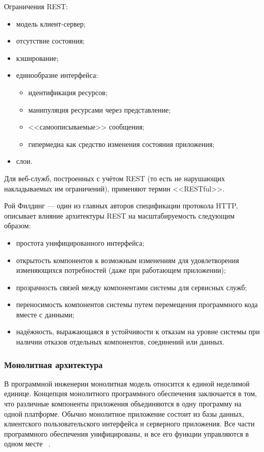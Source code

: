\documentclass[a4paper,14pt]{extarticle}
\begin{document}
 	Ограничения REST:
 	
 	\begin{itemize}
 		\item модель клиент-сервер; 
 		\item отсутствие состояния;
 		\item кэширование;
 		\item единообразие интерфейса:
 			\begin{itemize}
 				\item идентификация ресурсов;
 				\item манипуляция ресурсами через представление;
 				\item <<самоописываемые>> сообщения;
 				\item гипермедиа как средство изменения состояния приложения;
 			\end{itemize}
 		\item слои.
 	\end{itemize}
 
 	Для веб-служб, построенных с учётом REST (то есть не нарушающих накладываемых им ограничений), применяют термин <<RESTful>>.
 	
 	Рой Филдинг — один из главных авторов спецификации протокола HTTP, описывает влияние архитектуры REST на масштабируемость следующим образом:
 	
 	\begin{itemize}
 		\item простота унифицированного интерфейса;
 		\item открытость компонентов к возможным изменениям для удовлетворения изменяющихся потребностей (даже при работающем приложении);
 		\item прозрачность связей между компонентами системы для сервисных служб;
 		\item переносимость компонентов системы путем перемещения программного кода вместе с данными;
 		\item надёжность, выражающаяся в устойчивости к отказам на уровне системы при наличии отказов отдельных компонентов, соединений или данных.
 	\end{itemize}
 
 	\subsubsection{Монолитная архитектура}
 	
 	В программной инженерии монолитная модель относится к единой неделимой единице. Концепция монолитного программного обеспечения заключается в том, что различные компоненты приложения объединяются в одну программу на одной платформе. Обычно монолитное приложение состоит из базы данных, клиентского пользовательского интерфейса и серверного приложения. Все части программного обеспечения унифицированы, и все его функции управляются в одном месте ~\cite{mono}.
 	
\end{document}
